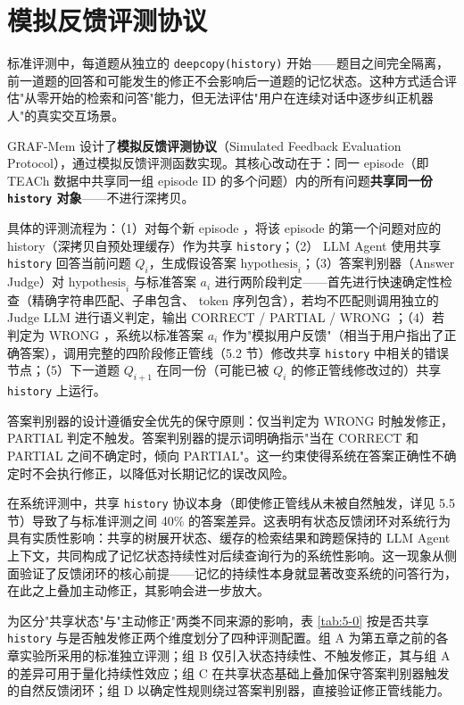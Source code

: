 \section{模拟反馈评测协议}

标准评测中，每道题从独立的 \texttt{deepcopy(history)} 开始——题目之间完全隔离，前一道题的回答和可能发生的修正不会影响后一道题的记忆状态。这种方式适合评估"从零开始的检索和问答"能力，但无法评估"用户在连续对话中逐步纠正机器人"的真实交互场景。

GRAF-Mem 设计了\textbf{模拟反馈评测协议}（Simulated Feedback Evaluation Protocol），通过模拟反馈评测函数实现。其核心改动在于：同一 episode（即 TEACh 数据中共享同一组 episode ID 的多个问题）内的所有问题\textbf{共享同一份 \texttt{history} 对象}——不进行深拷贝。

具体的评测流程为：（1）对每个新 episode ，将该 episode 的第一个问题对应的 history（深拷贝自预处理缓存）作为共享 \texttt{history}；（2） LLM Agent 使用共享 \texttt{history} 回答当前问题 $Q_i$，生成假设答案 $\mathrm{hypothesis}_i$；（3）答案判别器（Answer Judge）对 $\mathrm{hypothesis}_i$ 与标准答案 $a_i$ 进行两阶段判定——首先进行快速确定性检查（精确字符串匹配、子串包含、 token 序列包含），若均不匹配则调用独立的 Judge LLM 进行语义判定，输出 CORRECT / PARTIAL / WRONG ；（4）若判定为 WRONG ，系统以标准答案 $a_i$ 作为"模拟用户反馈"（相当于用户指出了正确答案），调用完整的四阶段修正管线（5.2 节）修改共享 \texttt{history} 中相关的错误节点；（5）下一道题 $Q_{i+1}$ 在同一份（可能已被 $Q_i$ 的修正管线修改过的）共享 \texttt{history} 上运行。

答案判别器的设计遵循安全优先的保守原则：仅当判定为 WRONG 时触发修正， PARTIAL 判定不触发。答案判别器的提示词明确指示"当在 CORRECT 和 PARTIAL 之间不确定时，倾向 PARTIAL"。这一约束使得系统在答案正确性不确定时不会执行修正，以降低对长期记忆的误改风险。

在系统评测中，共享 \texttt{history} 协议本身（即使修正管线从未被自然触发，详见 5.5 节）导致了与标准评测之间 40\% 的答案差异。这表明有状态反馈闭环对系统行为具有实质性影响：共享的树展开状态、缓存的检索结果和跨题保持的 LLM Agent 上下文，共同构成了记忆状态持续性对后续查询行为的系统性影响。这一现象从侧面验证了反馈闭环的核心前提——记忆的持续性本身就显著改变系统的问答行为，在此之上叠加主动修正，其影响会进一步放大。

为区分"共享状态"与"主动修正"两类不同来源的影响，表 \ref{tab:5-0} 按是否共享 \texttt{history} 与是否触发修正两个维度划分了四种评测配置。组 A 为第五章之前的各章实验所采用的标准独立评测；组 B 仅引入状态持续性、不触发修正，其与组 A 的差异可用于量化持续性效应；组 C 在共享状态基础上叠加保守答案判别器触发的自然反馈闭环；组 D 以确定性规则绕过答案判别器，直接验证修正管线能力。

